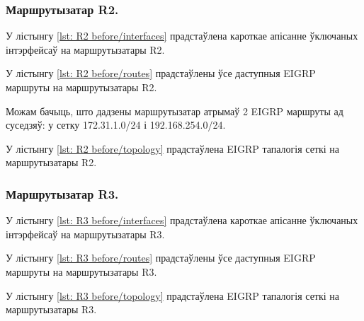 \subsubsection{Маршрутызатар R2.}

У лістынгу \ref{lst: R2 before/interfaces} прадстаўлена кароткае апісанне ўключаных інтэрфейсаў на маршрутызатары R2.



У лістынгу \ref{lst: R2 before/routes} прадстаўлены ўсе даступныя EIGRP маршруты на маршрутызатары R2.




Можам бачыць, што дадзены маршрутызатар атрымаў 2 EIGRP маршруты ад суседзяў: у сетку 172.31.1.0/24 і 192.168.254.0/24.

У лістынгу \ref{lst: R2 before/topology} прадстаўлена EIGRP тапалогія сеткі на маршрутызатары R2.



\subsubsection{Маршрутызатар R3.}

У лістынгу \ref{lst: R3 before/interfaces} прадстаўлена кароткае апісанне ўключаных інтэрфейсаў на маршрутызатары R3.



У лістынгу \ref{lst: R3 before/routes} прадстаўлены ўсе даступныя EIGRP маршруты на маршрутызатары R3.



У лістынгу \ref{lst: R3 before/topology} прадстаўлена EIGRP тапалогія сеткі на маршрутызатары R3.

